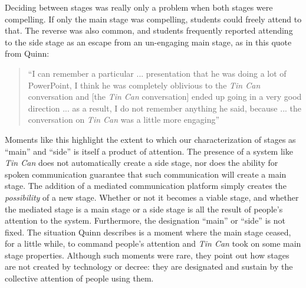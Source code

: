 

Deciding between stages was really only a problem when both stages were compelling. If only the main stage was compelling, students could freely attend to that. The reverse was also common, and students frequently reported attending to the side stage as an escape from an un-engaging main stage, as in this quote from Quinn:
\begin{quote}
``I can remember a particular ... presentation that he was doing a lot of PowerPoint, I think he was completely oblivious to the \emph{Tin Can} conversation and [the \emph{Tin Can} conversation] ended up going in a very good direction ... as a result, I do not remember anything he said, because ... the conversation on \emph{Tin Can} was a little more engaging''
\end{quote}




Moments like this highlight the extent to which our characterization of stages as ``main'' and ``side'' is itself a product of attention. The presence of a system like \emph{Tin Can} does not automatically create a side stage, nor does the ability for spoken communication guarantee that such communication will create a main stage.  The addition of a mediated communication platform simply creates the \emph{possibility} of a new stage. Whether or not it becomes a viable stage, and whether the mediated stage is a main stage or a side stage is all the result of people's attention to the system. Furthermore, the designation ``main'' or ``side'' is not fixed. The situation Quinn describes is a moment where the main stage ceased, for a little while, to command people's attention and \emph{Tin Can} took on some main stage properties. Although such moments were rare, they point out how stages are not created by technology or decree: they are designated and sustain by the collective attention of people using them.


